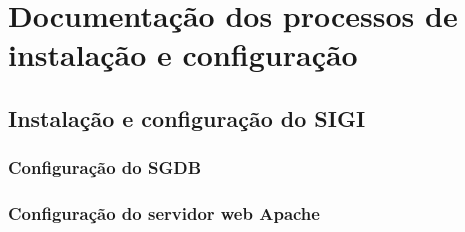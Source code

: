 %
%

\section{Documentação dos processos de instalação e configuração}
\subsection{Instalação e configuração do SIGI}
\subsubsection{Configuração do SGDB}
\subsubsection{Configuração do servidor web Apache}

%
%
